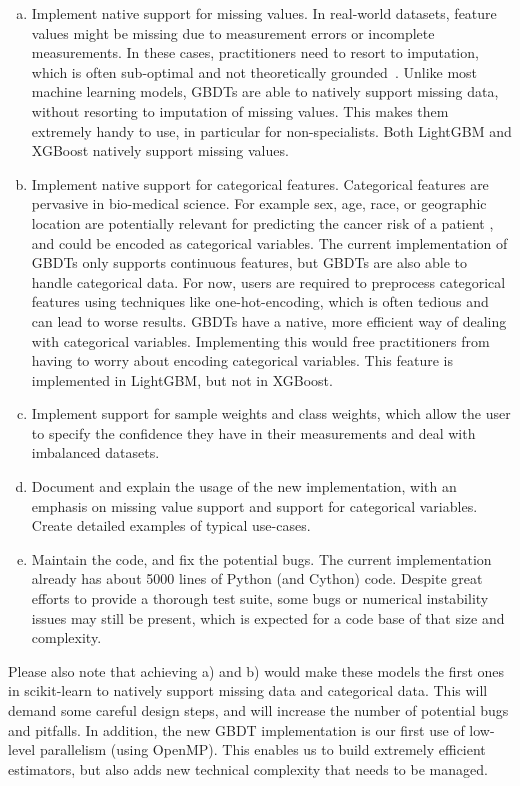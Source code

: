 \documentclass[11pt]{article}  %
\begin{document}
\begin{enumerate}[a)]
\item Implement native support for missing values. In real-world datasets, feature values might be missing due to measurement errors or incomplete measurements. In these cases, practitioners need to resort to
imputation, which is often sub-optimal and not theoretically grounded~\cite{missing_values_consistency}.
Unlike most machine learning models, GBDTs are able to natively support
missing data, without resorting to imputation of missing values. This makes
them extremely handy to use, in particular for non-specialists. Both
LightGBM and XGBoost natively support missing values.
\item Implement native support for categorical features. Categorical
features are pervasive in bio-medical science. For example sex, age, race,
or geographic location are potentially relevant
for predicting the cancer risk of a patient \cite{RICHTER201929}, and could be encoded as categorical variables. The current
implementation of GBDTs only supports continuous features, but GBDTs are
also able to handle categorical data. For now, users are required to
preprocess categorical features using techniques like one-hot-encoding, which
is often tedious and can lead to worse results. GBDTs have a native, more efficient way of dealing with categorical variables. 
Implementing this would free practitioners from having to worry about encoding categorical variables.
This feature is implemented in LightGBM, but not in XGBoost.
\item Implement support for sample weights and class weights, which allow the user to specify the confidence they have in their measurements and deal with imbalanced datasets.
\item Document and explain the usage of the new implementation, with an emphasis on missing value support and support for categorical variables. Create detailed examples of typical use-cases.
\item Maintain the code, and fix the potential bugs. The current
implementation already has about 5000 lines of Python (and Cython) code.
Despite great efforts to provide a thorough test suite, some bugs or
numerical instability issues may still be present, which is expected for a
code base of that size and complexity.
\end{enumerate}

Please also note that achieving a) and b) would make these models the
first ones in scikit-learn to natively support missing data and
categorical data. This will demand some careful design steps, and will increase the number of potential bugs and pitfalls.
In addition, the new GBDT implementation is our first use of low-level
parallelism (using OpenMP). This enables us to build extremely
efficient estimators, but also adds new technical complexity that needs to
be managed.
\end{document}
